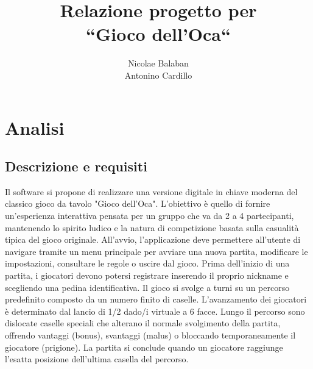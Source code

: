 \documentclass[a4paper,12pt]{report}
\title{Relazione progetto per\\``Gioco dell'Oca``}
\author{Nicolae Balaban\\ Antonino Cardillo}
\date{\DTMdate{2026-10-01}}
\begin{document}
\maketitle

\tableofcontents

\chapter{Analisi}

\section{Descrizione e requisiti}

Il software si propone di realizzare una versione digitale in chiave moderna del classico gioco da tavolo "Gioco dell'Oca". L'obiettivo è quello di fornire un'esperienza interattiva pensata per un gruppo che va da 2 a 4 partecipanti, mantenendo lo spirito ludico e la natura di competizione basata sulla casualità tipica del gioco originale. All'avvio, l'applicazione deve permettere all'utente di navigare tramite un menu principale per avviare una nuova partita, modificare le impostazioni, consultare le regole o uscire dal gioco. Prima dell'inizio di una partita, i giocatori devono potersi registrare inserendo il proprio nickname e scegliendo una pedina identificativa. Il gioco si svolge a turni su un percorso predefinito composto da un numero finito di caselle. L'avanzamento dei giocatori è determinato dal lancio di 1/2 dado/i virtuale a 6 facce. Lungo il percorso sono dislocate caselle speciali che alterano il normale svolgimento della partita, offrendo vantaggi (bonus), svantaggi (malus) o bloccando temporaneamente il giocatore (prigione). La partita si conclude quando un giocatore raggiunge l'esatta posizione dell'ultima casella del percorso.
\end{document}
